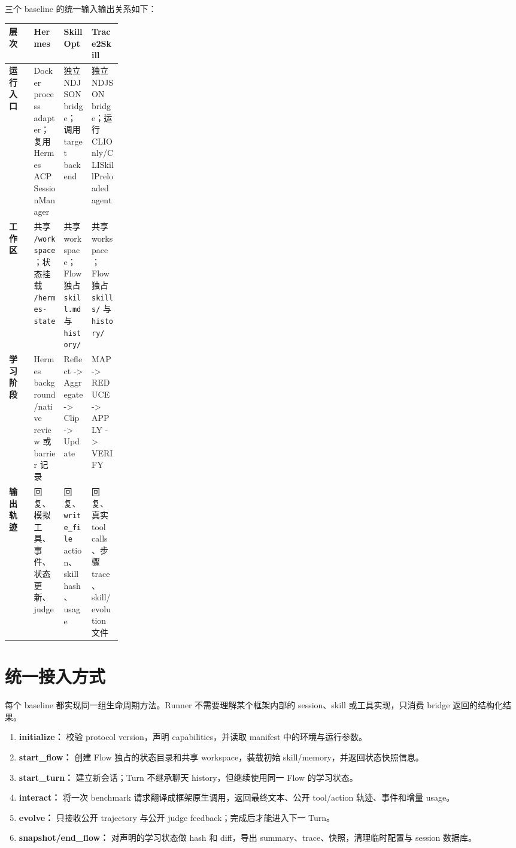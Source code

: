 \documentclass[11pt,a4paper]{article}
\newcommand{\code}[1]{\texttt{#1}}
\begin{document}
三个 baseline 的统一输入输出关系如下：

\begin{center}
\renewcommand{\arraystretch}{1.25}
\begin{tabularx}{0.98\linewidth}{>{\bfseries}p{0.22\linewidth}XXX}
\toprule
层次 & Hermes & SkillOpt & Trace2Skill \\
\midrule
运行入口 & Docker process adapter；复用 Hermes ACP SessionManager & 独立 NDJSON bridge；调用 target backend & 独立 NDJSON bridge；运行 CLIOnly/CLISkillPreloaded agent \\
工作区 & 共享 \code{/workspace}；状态挂载 \code{/hermes-state} & 共享 workspace；Flow 独占 \code{skill.md} 与 \code{history/} & 共享 workspace；Flow 独占 \code{skills/} 与 \code{history/} \\
学习阶段 & Hermes background/native review 或 barrier 记录 & Reflect -> Aggregate -> Clip -> Update & MAP -> REDUCE -> APPLY -> VERIFY \\
输出轨迹 & 回复、模拟工具、事件、状态更新、judge & 回复、\code{write\_file} action、skill hash、usage & 回复、真实 tool calls、步骤 trace、skill/evolution 文件 \\
\bottomrule
\end{tabularx}
\end{center}

\section{统一接入方式}

每个 baseline 都实现同一组生命周期方法。Runner 不需要理解某个框架内部的 session、skill 或工具实现，只消费 bridge 返回的结构化结果。

\begin{enumerate}
\item \textbf{initialize：} 校验 protocol version，声明 capabilities，并读取 manifest 中的环境与运行参数。
\item \textbf{start\_flow：} 创建 Flow 独占的状态目录和共享 workspace，装载初始 skill/memory，并返回状态快照信息。
\item \textbf{start\_turn：} 建立新会话；Turn 不继承聊天 history，但继续使用同一 Flow 的学习状态。
\item \textbf{interact：} 将一次 benchmark 请求翻译成框架原生调用，返回最终文本、公开 tool/action 轨迹、事件和增量 usage。
\item \textbf{evolve：} 只接收公开 trajectory 与公开 judge feedback；完成后才能进入下一 Turn。
\item \textbf{snapshot/end\_flow：} 对声明的学习状态做 hash 和 diff，导出 summary、trace、快照，清理临时配置与 session 数据库。
\end{enumerate}
\end{document}
